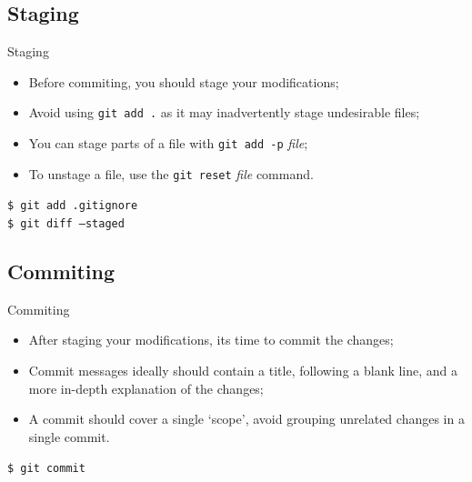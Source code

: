 \documentclass{beamer}
\begin{document}
\subsection{Staging}
\begin{frame}{Staging}
  \begin{itemize}
    \item Before commiting, you should stage your modifications;
    \item Avoid using \texttt{git add .} as it may inadvertently stage undesirable files;
    \item You can stage parts of a file with \texttt{git add -p} \textit{file};
    \item To unstage a file, use the \texttt{git reset} \textit{file} command.
  \end{itemize}
  \begin{block}{}
    \texttt{\$ git add .gitignore} \\
    \texttt{\$ git diff --staged}
  \end{block}
\end{frame}

\subsection{Commiting}
\begin{frame}{Commiting}
  \begin{itemize}
    \item After staging your modifications, its time to commit the changes;
    \item Commit messages ideally should contain a title, following a blank line, and a more in-depth explanation of the changes;
    \item A commit should cover a single `scope', avoid grouping unrelated changes in a single commit.
  \end{itemize}
  \begin{block}{}
    \texttt{\$ git commit}
  \end{block}
  \begin{scriptsize}
    
  \end{scriptsize}
\end{frame}
\end{document}
